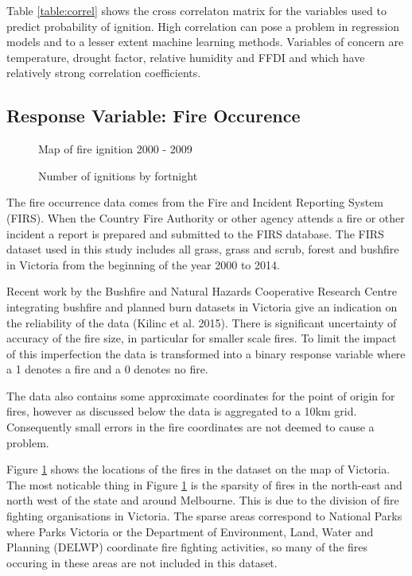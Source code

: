\documentclass{article}
\begin{document}
Table \ref{table:correl} shows the cross correlaton matrix for the variables used to predict probability of ignition. High correlation can pose a problem in regression models and to a lesser extent machine learning methods. Variables of concern are temperature, drought factor, relative humidity and FFDI and  which have relatively strong correlation coefficients. 

\subsection{Response Variable: Fire Occurence}

\begin{figure}[h]
	\centering 
	\caption{Map of fire ignition 2000 - 2009} 
	\label{fig:firemap} 
\end{figure}

\begin{figure}[h]
	\centering 
	\caption{Number of ignitions by fortnight} 
	\label{fig:occ} 
\end{figure}

The fire occurrence data comes from the Fire and Incident Reporting System (FIRS). When the Country Fire Authority or other agency attends a fire or other incident a report is prepared and submitted to the FIRS database. The FIRS dataset used in this study includes all grass, grass and scrub, forest and bushfire in Victoria from the beginning of the year 2000 to 2014. 

Recent work by the Bushfire and Natural Hazards Cooperative Research Centre integrating bushfire and planned burn datasets in Victoria give an indication on the reliability of the data (Kilinc et al. 2015).  There is significant uncertainty of accuracy of the fire size, in particular for smaller scale fires. To limit the impact of this imperfection the data is transformed into a binary response variable where a 1 denotes a fire and a 0 denotes no fire. 

The data also contains some approximate coordinates for the point of origin for fires, however as discussed below the data is aggregated to a 10km grid. Consequently small errors in the fire coordinates are not deemed to cause a problem. 

Figure \ref{fig:firemap} shows the locations of the fires in the dataset on the map of Victoria. The most noticable thing in Figure \ref{fig:firemap} is the sparsity of fires in the north-east and north west of the state and around Melbourne. This is due to the division of fire fighting organisations in Victoria. The sparse areas correspond to National Parks where Parks Victoria or the Department of Environment, Land, Water and Planning (DELWP) coordinate fire fighting activities, so many of the fires occuring in these areas are not included in this dataset. 
\end{document}
